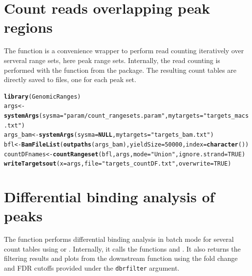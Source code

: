 \documentclass{article}\usepackage[]{graphicx}\usepackage[]{color}
\makeatletter
\newcommand{\hlnum}[1]{\textcolor[rgb]{0.686,0.059,0.569}{#1}}%
\newcommand{\hlstr}[1]{\textcolor[rgb]{0.192,0.494,0.8}{#1}}%
\newcommand{\hlstd}[1]{\textcolor[rgb]{0.345,0.345,0.345}{#1}}%
\newcommand{\hlkwa}[1]{\textcolor[rgb]{0.161,0.373,0.58}{\textbf{#1}}}%
\newcommand{\hlkwb}[1]{\textcolor[rgb]{0.69,0.353,0.396}{#1}}%
\newcommand{\hlkwc}[1]{\textcolor[rgb]{0.333,0.667,0.333}{#1}}%
\newcommand{\hlkwd}[1]{\textcolor[rgb]{0.737,0.353,0.396}{\textbf{#1}}}%
\newenvironment{kframe}{%
 \def\at@end@of@kframe{}%
 \ifinner\ifhmode%
  \def\at@end@of@kframe{\end{minipage}}%
  \begin{minipage}{\columnwidth}%
 \fi\fi%
 \def\FrameCommand##1{\hskip\@totalleftmargin \hskip-\fboxsep
 \colorbox{shadecolor}{##1}\hskip-\fboxsep
     \hskip-\linewidth \hskip-\@totalleftmargin \hskip\columnwidth}%
 \MakeFramed {\advance\hsize-\width
   \@totalleftmargin\z@ \linewidth\hsize
   \@setminipage}}%
 {\par\unskip\endMakeFramed%
 \at@end@of@kframe}
\newenvironment{knitrout}{}{} %
\newcommand{\Rfunarg}[1]{{\texttt{#1}}}
\makeatother
\begin{document}
\section{Count reads overlapping peak regions}
The  function is a convenience wrapper to perform read counting iteratively over serveral range sets, here peak range sets. Internally, the read counting is performed with the  function from the  package. The resulting count tables are directly saved to files, one for each peak set.

\begin{knitrout}
\color{fgcolor}\begin{kframe}
\begin{alltt}
\hlkwd{library}\hlstd{(GenomicRanges)}
\hlstd{args} \hlkwb{<-} \hlkwd{systemArgs}\hlstd{(}\hlkwc{sysma}\hlstd{=}\hlstr{"param/count_rangesets.param"}\hlstd{,} \hlkwc{mytargets}\hlstd{=}\hlstr{"targets_macs.txt"}\hlstd{)}
\hlstd{args_bam} \hlkwb{<-} \hlkwd{systemArgs}\hlstd{(}\hlkwc{sysma}\hlstd{=}\hlkwa{NULL}\hlstd{,} \hlkwc{mytargets}\hlstd{=}\hlstr{"targets_bam.txt"}\hlstd{)}
\hlstd{bfl} \hlkwb{<-} \hlkwd{BamFileList}\hlstd{(}\hlkwd{outpaths}\hlstd{(args_bam),} \hlkwc{yieldSize}\hlstd{=}\hlnum{50000}\hlstd{,} \hlkwc{index}\hlstd{=}\hlkwd{character}\hlstd{())}
\hlstd{countDFnames} \hlkwb{<-} \hlkwd{countRangeset}\hlstd{(bfl, args,} \hlkwc{mode}\hlstd{=}\hlstr{"Union"}\hlstd{,} \hlkwc{ignore.strand}\hlstd{=}\hlnum{TRUE}\hlstd{)}
\hlkwd{writeTargetsout}\hlstd{(}\hlkwc{x}\hlstd{=args,} \hlkwc{file}\hlstd{=}\hlstr{"targets_countDF.txt"}\hlstd{,} \hlkwc{overwrite}\hlstd{=}\hlnum{TRUE}\hlstd{)}
\end{alltt}
\end{kframe}
\end{knitrout}

\section{Differential binding analysis of peaks}
The function  performs differential binding analysis in batch mode for several count tables using  or  \citep{Robinson2010-uk, Love2014-sh}. Internally, it calls the functions  and . It also returns the filtering results and plots from the downstream  function using the fold change and FDR cutoffs provided under the \Rfunarg{dbrfilter} argument.
 
\end{document}
